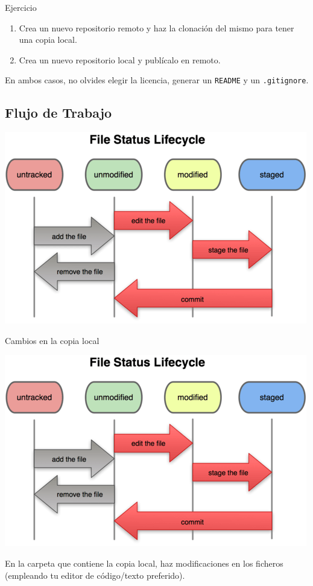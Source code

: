 \documentclass[aspectratio=169, xcolor={usenames,svgnames,dvipsnames}]{beamer}
\begin{document}
\begin{frame}[fragile,label={sec:orgcd24128}]{}
 \begin{block}{Ejercicio}
\begin{enumerate}
\item Crea un nuevo repositorio remoto y haz la clonación del mismo para tener una copia local.
\item Crea un nuevo repositorio local y publícalo en remoto.
\end{enumerate}

En ambos casos, no olvides elegir la licencia, generar un \texttt{README} y un \texttt{.gitignore}.
\end{block}
\end{frame}
\subsection{Flujo de Trabajo}
\label{sec:orgf7241ed}
\begin{frame}[label={sec:orgf1711e1}]{}
\begin{center}
\includegraphics[width=.9\linewidth]{figs/git_estados.png}
\end{center}
\end{frame}

\begin{frame}[label={sec:org8f80313}]{Cambios en la copia local}
\begin{center}
\includegraphics[height=0.4\textheight]{figs/git_estados.png}
\end{center}

En la carpeta que contiene la copia local, haz \alert{modificaciones} en los ficheros (empleando tu editor de código/texto preferido).
\end{frame}
\end{document}
